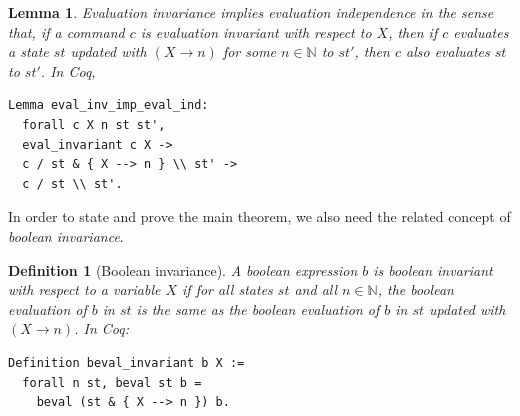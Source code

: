 \documentclass[compsoc,conference,a4paper,10pt,times]{IEEEtran}
\newtheorem{lemma}[theorem]{Lemma}
\newtheorem{defin}[theorem]{Definition}
\begin{document}
\begin{lemma}\label{independence}
Evaluation invariance implies evaluation independence in the sense that, if a command $c$ is evaluation invariant with respect to $X$, then if $c$ evaluates a state $st$ updated with $(X\longrightarrow n)$ for some $n \in \mathbb{N}$ to $st'$, then $c$ also evaluates $st$ to $st'$.  In Coq,
\begin{verbatim}
Lemma eval_inv_imp_eval_ind: 
  forall c X n st st', 
  eval_invariant c X ->
  c / st & { X --> n } \\ st' -> 
  c / st \\ st'.
\end{verbatim}
\end{lemma}

In order to state and prove the main theorem, we also need the related concept of \emph{boolean invariance}.
\begin{defin}[Boolean invariance]
A boolean expression $b$ is \emph{boolean invariant} with respect to a variable $X$ if for all states $st$ and all $n \in \mathbb{N}$, the boolean evaluation of $b$ in $st$ is the same as the boolean evaluation of $b$ in $st$ updated with $(X\longrightarrow n)$.
In Coq:
\begin{verbatim}
Definition beval_invariant b X :=
  forall n st, beval st b = 
    beval (st & { X --> n }) b. 
\end{verbatim}
\end{defin}
\end{document}
